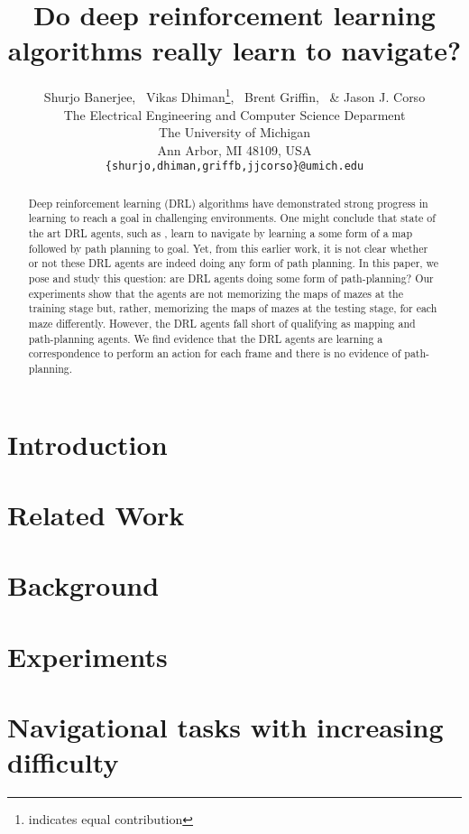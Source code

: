 \documentclass{article} %
\title{Do deep reinforcement learning algorithms really learn to navigate?}
\author{Shurjo Banerjee\footnotemark[1],%
  \, Vikas Dhiman\thanks{indicates equal contribution},%
  \, Brent Griffin,%
  \, \& Jason J. Corso\\
  The Electrical Engineering and Computer Science Deparment\\
The University of Michigan\\
Ann Arbor, MI 48109, USA \\
\texttt{\{shurjo,dhiman,griffb,jjcorso\}@umich.edu} \\
}
\begin{document}
\maketitle

\begin{abstract}
  Deep reinforcement learning (DRL) algorithms have demonstrated strong progress in learning to reach a goal in challenging environments.
  One might conclude that state of the art DRL agents, such as \cite{MiPaViICLR2017}, learn to navigate by learning a some form of a map followed by path planning to goal.
  Yet, from this earlier work, it is not clear whether or not these DRL agents are indeed doing any form of path planning.
  In this paper, we pose and study this question: are DRL agents doing some form of path-planning?  Our experiments show that the agents are not memorizing the maps of mazes at the training stage but, rather, memorizing the maps of mazes at the testing stage, for each maze differently.
  However, the DRL agents fall short of qualifying as mapping and path-planning agents.
  We find evidence that the DRL agents are learning a correspondence to perform an action for each frame and there is no evidence of path-planning.
\end{abstract}

\section{Introduction}
%

\section{Related Work}


\section{Background}


%
\section{Experiments}
\section{Navigational tasks with increasing difficulty}
\label{sec:navtasks}

\end{document}
